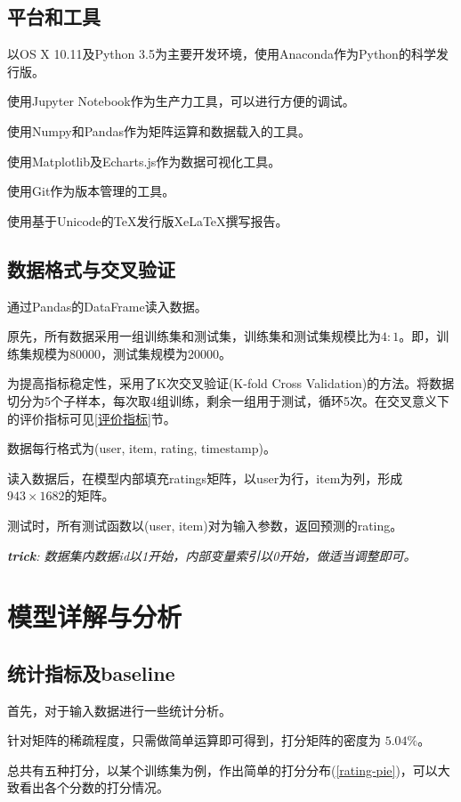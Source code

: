 \documentclass[utf8, a4paper, 11pt, onecolumn]{ctexart}
\begin{document}
\begin{spacing}{1.3}
\subsection{平台和工具}

以OS X 10.11及Python 3.5为主要开发环境，使用Anaconda作为Python的科学发行版。

使用Jupyter Notebook作为生产力工具，可以进行方便的调试。

使用Numpy和Pandas作为矩阵运算和数据载入的工具。

使用Matplotlib及Echarts.js作为数据可视化工具。

使用Git作为版本管理的工具。

使用基于Unicode的TeX发行版XeLaTeX撰写报告。

\subsection{数据格式与交叉验证}

通过Pandas的DataFrame读入数据。

原先，所有数据采用一组训练集和测试集，训练集和测试集规模比为$4:1$。即，训练集规模为80000，测试集规模为20000。

为提高指标稳定性，采用了K次交叉验证(K-fold Cross Validation)的方法。将数据切分为5个子样本，每次取4组训练，剩余一组用于测试，循环5次。在交叉意义下的评价指标可见\ref{评价指标}节。

数据每行格式为(user, item, rating, timestamp)。

读入数据后，在模型内部填充ratings矩阵，以user为行，item为列，形成$943 \times 1682$的矩阵。

测试时，所有测试函数以(user, item)对为输入参数，返回预测的rating。

\textit{\textbf{trick}: 数据集内数据id以1开始，内部变量索引以0开始，做适当调整即可。}

\section{模型详解与分析}
\label{模型详解}

\subsection{统计指标及baseline}

首先，对于输入数据进行一些统计分析。

针对矩阵的稀疏程度，只需做简单运算即可得到，打分矩阵的密度为 $5.04\%$。

总共有五种打分，以某个训练集为例，作出简单的打分分布(\ref{rating-pie})，可以大致看出各个分数的打分情况。


\end{spacing}
\end{document}

